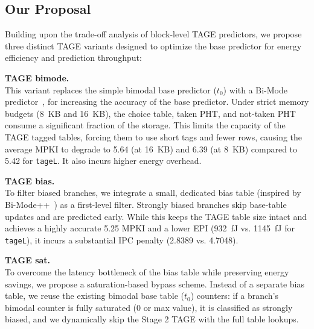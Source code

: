 \documentclass[11pt,a4paper,twocolumn]{article}
\begin{document}
\subsection{Our Proposal}
Building upon the trade-off analysis of block-level TAGE predictors, we propose three distinct TAGE variants designed to optimize the base predictor for energy efficiency and prediction throughput:

\vspace{0.2cm}
\textbf{TAGE bimode.} \\
This variant replaces the simple bimodal base predictor ($t_0$) with a Bi-Mode predictor~\cite{lee1997bimode}, for increasing the accuracy of the base predictor. Under strict memory budgets (8~KB and 16~KB), the choice table, taken PHT, and not-taken PHT consume a significant fraction of the storage. This limits the capacity of the TAGE tagged tables, forcing them to use short tags and fewer rows, causing the average MPKI to degrade to 5.64 (at 16~KB) and 6.39 (at 8~KB) compared to 5.42 for \texttt{tageL}. It also incurs higher energy overhead.

\vspace{0.2cm}
\textbf{TAGE bias.} \\
To filter biased branches, we integrate a small, dedicated bias table (inspired by Bi-Mode++~\cite{kise2005bimode}) as a first-level filter. Strongly biased branches skip base-table updates and are predicted early. While this keeps the TAGE table size intact and achieves a highly accurate 5.25 MPKI and a lower EPI (932~fJ vs. 1145~fJ for \texttt{tageL}), it incurs a substantial IPC penalty (2.8389 vs. 4.7048). 

\vspace{0.2cm}
\textbf{TAGE sat.} \\
To overcome the latency bottleneck of the bias table while preserving energy savings, we propose a saturation-based bypass scheme. Instead of a separate bias table, we reuse the existing bimodal base table ($t_0$) counters: if a branch's bimodal counter is fully saturated (0 or max value), it is classified as strongly biased, and we dynamically skip the Stage 2 TAGE with the full table lookups. 
\end{document}
